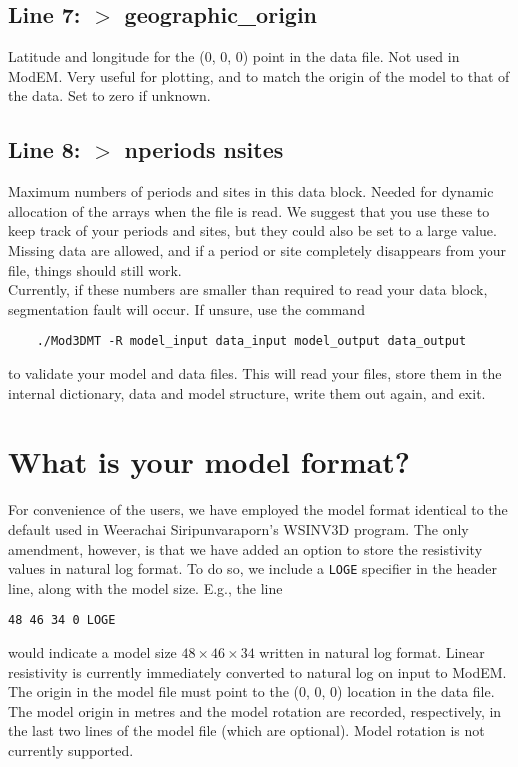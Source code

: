 \documentclass[12pt]{article}
\begin{document}
\subsection*{Line 7: $>$ geographic\_origin}
Latitude and longitude for the (0, 0, 0) point in the data file. Not used in ModEM. Very useful for plotting, and to match the origin of the model to that of the data. Set to zero if unknown.

\subsection*{Line 8: $>$ nperiods nsites}
Maximum numbers of periods and sites in this data block. Needed for dynamic allocation of the arrays when the file is read. We suggest that you use these to keep track of your periods and sites, but they could also be set to a large value. Missing data are allowed, and if a period or site completely disappears from your file, things should still work.\\

Currently, if these numbers are smaller than required to read your data block, segmentation fault will occur. If unsure, use the command
\begin{verbatim}
    ./Mod3DMT -R model_input data_input model_output data_output
\end{verbatim}
to validate your model and data files. This will read your files, store them in the internal dictionary, data and model structure, write them out again, and exit.


\section{What is your model format?}

For convenience of the users, we have employed the model format identical to the default used in Weerachai Siripunvaraporn's WSINV3D program. The only amendment, however, is that we have added an option to store the resistivity values in natural log format. To do so, we include a \verb"LOGE" specifier in the header line, along with the model size. E.g., the line
\begin{verbatim}
48 46 34 0 LOGE
\end{verbatim}
would indicate a model size $48 \times 46 \times 34$ written in natural log format. Linear resistivity is currently immediately converted to natural log on input to ModEM.\\

The origin in the model file must point to the (0, 0, 0) location in the data file. The model origin in metres and the model rotation are recorded, respectively, in the last two lines of the model file (which are optional). Model rotation is not currently supported.\\
\end{document}
